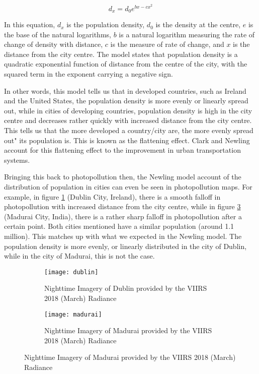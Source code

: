 \begin{equation}
\label{Newling}
 d_x = d_0e^{bx-cx^{2}}
\end{equation}

In this equation, $d_x$ is the population density, $d_0$ is the density at the centre, $e$ is the base of the natural logarithms, $b$ is a natural logarithm measuring the rate of change of density with distance, $c$ is the measure of rate of change, and $x$ is the distance from the city centre. The model states that population density is a quadratic exponential function of distance from the centre of the city, with the squared term in the exponent carrying a negative sign. \cite{newlingmodel}

In other words, this model tells us that in developed countries, such as Ireland and the United States, the  population density is more evenly or linearly spread out, while in cities of developing countries, population density is high in the city centre and decreases rather quickly with increased distance from the city centre. This tells us that the more developed a country/city are, the more evenly spread out" its population is. This is known as the flattening effect. Clark and Newling account for this flattening effect to the improvement in urban transportation systems.\cite{newlingmodel}

Bringing this back to photopollution then, the Newling model account of the distribution of population in cities can even be seen in photopollution maps. For example, in figure \ref{Dublin} (Dublin City, Ireland)\cite{DublinVIIRS}, there is a smooth falloff in photopollution with increased distance from the city centre, while in figure \ref {Madurai} (Madurai City, India)\cite{MaduraiVIIRS}, there is a rather sharp falloff in photopollution after a certain point. Both cities mentioned have a similar population (around 1.1 million). This matches up with what we expected in the Newling model. The population density is more evenly, or linearly distributed in the city of Dublin, while in the city of Madurai, this is not the case. 

\begin{figure}[H]
    \centering
    \caption{Nighttime Imagery of Cities as provided by the VIIRS 2018 (March) Radiance. VIIRS is one of five key instruments associated with the Suomi NPP satellite that was launched on October 28, 2011.}
    \label{fig:1}
    \begin{subfigure}{.48\textwidth}
        \centering
        \texttt{[image: dublin]}
        \caption{Nighttime Imagery of Dublin provided by the VIIRS 2018 (March) Radiance}
        \label{Dublin}
    \end{subfigure}
    \hfill
    \begin{subfigure}{.48\textwidth}
        \centering
        \texttt{[image: madurai]}
        \caption{Nighttime Imagery of Madurai provided by the VIIRS 2018 (March) Radiance}
        \label{Madurai}
    \end{subfigure}
\end{figure}

